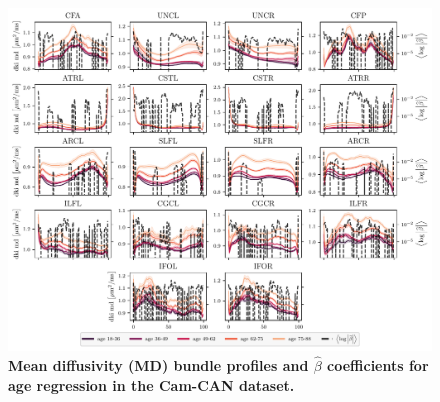 \documentclass[10pt,%
               aps,%
               prl,%
               preprint,%
               superscriptaddress,%
               preprintnumbers,%
               amsmath,%
               floatfix,%
               endfloats*]{revtex4-2}
\begin{document}
\begin{figure}
    \includegraphics[width=\textwidth]{cc_coefs_profiles_md.pdf}
    \caption{%
        {%
            \bf Mean diffusivity (MD) bundle profiles and $\hat{\beta}$
            coefficients for age regression in the Cam-CAN dataset.
        }
        \label{fig:cc-bp:md}
    }
\end{figure}

\printfigures



\end{document}
